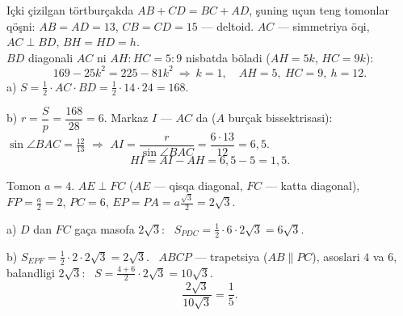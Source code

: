 \newpage
{}
Içki çizilgan törtburçakda $AB+CD=BC+AD$, şuning uçun teng tomonlar qöşni: $AB=AD=13$, $CB=CD=15$ — deltoid. $AC$ — simmetriya öqi, $AC\perp BD$, $BH=HD=h$.\\
$BD$ diagonali $AC$ ni $AH:HC=5:9$ nisbatda böladi ($AH=5k$, $HC=9k$):
\[169-25k^2=225-81k^2\ \Rightarrow\ k=1,\quad AH=5,\ HC=9,\ h=12.\]
a) $S=\frac12\cdot AC\cdot BD=\frac12\cdot14\cdot24=168$.

b) $r=\dfrac Sp=\dfrac{168}{28}=6$. Markaz $I$ — $AC$ da ($A$ burçak bissektrisasi): \ $\sin\angle BAC=\frac{12}{13}$ $\Rightarrow$ $AI=\dfrac r{\sin\angle BAC}=\dfrac{6\cdot13}{12}=6{,}5$.
\[HI=AI-AH=6{,}5-5=1{,}5.\]

\newpage
{}
Tomon $a=4$. $AE\perp FC$ ($AE$ — qisqa diagonal, $FC$ — katta diagonal), $FP=\frac a2=2$, $PC=6$, $EP=PA=a\frac{\sqrt3}2=2\sqrt3$.

a) $D$ dan $FC$ gaça masofa $2\sqrt3$: \ $S_{PDC}=\frac12\cdot6\cdot2\sqrt3=6\sqrt3$.

b) $S_{EPF}=\frac12\cdot2\cdot2\sqrt3=2\sqrt3$. \ $ABCP$ — trapetsiya ($AB\parallel PC$), asoslari $4$ va $6$, balandligi $2\sqrt3$: \ $S=\frac{4+6}2\cdot2\sqrt3=10\sqrt3$.
\[\frac{2\sqrt3}{10\sqrt3}=\frac15.\]

